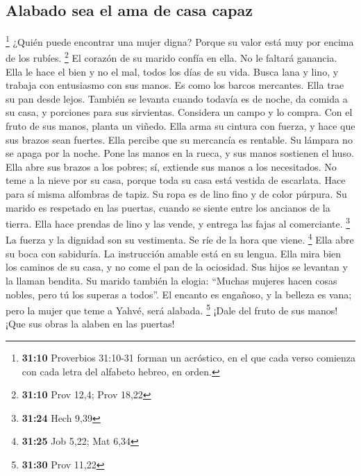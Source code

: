 \begin{paracol}{2}
\hypertarget{alabado-sea-el-ama-de-casa-capaz}{%
\subsection{Alabado sea el ama de casa
capaz}\label{alabado-sea-el-ama-de-casa-capaz}}

 \footnote{\textbf{31:10} Proverbios 31:10-31 forman un
  acróstico, en el que cada verso comienza con cada letra del alfabeto
  hebreo, en orden.} ¿Quién puede encontrar una mujer digna? Porque su
valor está muy por encima de los rubíes. \footnote{\textbf{31:10} Prov
  12,4; Prov 18,22}  El corazón de su marido confía en
ella. No le faltará ganancia.  Ella le hace el bien y no
el mal, todos los días de su vida.  Busca lana y lino, y
trabaja con entusiasmo con sus manos.  Es como los barcos
mercantes. Ella trae su pan desde lejos.  También se
levanta cuando todavía es de noche, da comida a su casa, y porciones
para sus sirvientas.  Considera un campo y lo compra. Con
el fruto de sus manos, planta un viñedo.  Ella arma su
cintura con fuerza, y hace que sus brazos sean fuertes. 
Ella percibe que su mercancía es rentable. Su lámpara no se apaga por la
noche.  Pone las manos en la rueca, y sus manos sostienen
el huso.  Ella abre sus brazos a los pobres; sí, extiende
sus manos a los necesitados.  No teme a la nieve por su
casa, porque toda su casa está vestida de escarlata. 
Hace para sí misma alfombras de tapiz. Su ropa es de lino fino y de
color púrpura.  Su marido es respetado en las puertas,
cuando se siente entre los ancianos de la tierra.  Ella
hace prendas de lino y las vende, y entrega las fajas al comerciante.
\footnote{\textbf{31:24} Hech 9,39}  La fuerza y la
dignidad son su vestimenta. Se ríe de la hora que viene. \footnote{\textbf{31:25}
  Job 5,22; Mat 6,34}  Ella abre su boca con sabiduría.
La instrucción amable está en su lengua.  Ella mira bien
los caminos de su casa, y no come el pan de la ociosidad.
 Sus hijos se levantan y la llaman bendita. Su marido
también la elogia:  ``Muchas mujeres hacen cosas nobles,
pero tú los superas a todos''.  El encanto es engañoso, y
la belleza es vana; pero la mujer que teme a Yahvé, será alabada.
\footnote{\textbf{31:30} Prov 11,22}  ¡Dale del fruto de
sus manos! ¡Que sus obras la alaben en las puertas! \switchcolumn
\begin{otherlanguage}{english}


\end{otherlanguage}
\end{paracol}
